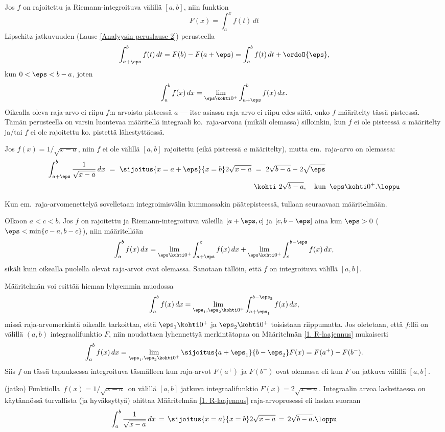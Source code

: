 Jos $f$ on rajoitettu ja Riemann-integroituva välillä $[a,b]$, niin funktion
\[
F(x)=\int_a^x f(t)\, dt
\]
Lipschitz-jatkuvuuden (Lause \ref{Analyysin peruslause 2}) perusteella
\[
\int_{a+\eps}^b f(t)\, dt = F(b)-F(a+\eps) = \int_a^b f(t)\, dt + \ordoO{\eps},
\]
kun $0<\eps<b-a$, joten
\[
\int_a^b f(x)\, dx = \lim_{\eps \kohti 0^+} \int_{a+\eps}^b f(x)\, dx.
\]
Oikealla oleva raja-arvo ei riipu $f$:n arvoista pisteessä $a$ --- itse asiassa raja-arvo ei
riipu edes siitä, onko $f$ määritelty tässä pisteessä. Tämän perusteella on varsin luontevaa
määritellä integraali ko.\ raja-arvona (mikäli olemassa) silloinkin, kun $f$ ei ole pisteessä 
$a$ määritelty ja/tai $f$ ei ole rajoitettu ko. pistettä lähestyttäessä.
\begin{Exa} \label{epäoleellinen esim1} Jos $f(x)=1/\sqrt{x-a}$, niin $f$ ei ole välillä 
$[a,b]$ rajoitettu (eikä pisteessä $a$ määritelty), mutta em.\ raja-arvo on olemassa: 
\begin{align*}
\int_{a+\eps}^b \frac{1}{\sqrt{x-a}}\,dx\ 
                      =\ \sijoitus{x=a+\eps}{x=b} 2\sqrt{x-a}\
                     &=\ 2\sqrt{b-a}-2\sqrt{\eps} \\ 
                     &\kohti\ 2\sqrt{b-a}, \quad \text{kun}\,\ \eps \kohti 0^+. \loppu
\end{align*}
\end{Exa}
Kun em.\ raja-arvomenettelyä sovelletaan integroimisvälin kummassakin päätepisteessä, tullaan
seuraavaan määritelmään.
\begin{Def} \vahv{(Riemannin integraalin 1. laajennus)} \label{1. R-laajennus}
 Olkoon $a<c<b$. Jos $f$ on rajoitettu ja
Riemann-integroituva väleillä $[a+\eps,c]$ ja $[c,b-\eps]$ aina kun $\eps>0$
($\eps<\min\{c-a,b-c\}$), niin määritellään
\[
\int_a^b f(x)\, dx = \lim_{\eps \kohti 0^+} \int_{a+\eps}^c f(x)\,dx
                   + \lim_{\eps \kohti 0^+} \int_c^{b-\eps} f(x)\,dx,
\]
sikäli kuin oikealla puolella olevat raja-arvot ovat olemassa. Sanotaan tällöin, että $f$ on
integroituva välillä $[a,b]$.
\end{Def}
Määritelmän voi esittää hieman lyhyemmin muodossa
\[
\int_a^b f(x)\,dx = \lim_{\eps_1,\eps_2 \kohti 0^+} \int_{a+\eps_1}^{b-\eps_2} f(x)\,dx,
\]
missä raja-arvomerkintä oikealla tarkoittaa, että $\eps_1 \kohti 0^+$ ja $\eps_2 \kohti 0^+$
toisistaan riippumatta. Jos oletetaan, että $f$:llä on välillä $(a,b)$ integraalifunktio $F$,
niin noudattaen lyhennettyä merkintätapaa on Määritelmän \ref{1. R-laajennus} mukaisesti
\[
\int_a^b f(x)\,dx = \lim_{\eps_1,\eps_2 \kohti 0^+}\sijoitus{a+\eps_1}{b-\eps_2} F(x)
                  = F(a^+)-F(b^-).
\]
Siis $f$ on tässä tapauksessa integroituva täsmälleen kun raja-arvot $F(a^+)$ ja $F(b^-)$ ovat
olemassa eli kun $F$ on jatkuva välillä $[a,b]$.
\jatko \begin{Exa} (jatko) Funktiolla $\,f(x)=1/\sqrt{x-a}\,$ on välillä $[a,b]$ jatkuva
integraalifunktio $F(x)=2\sqrt{x-a}$. Integraalin arvoa laskettaessa on käytännössä
turvallista (ja hyväksyttyä) ohittaa Määritelmän \ref{1. R-laajennus} raja-arvoprosessi eli
laskea suoraan
\[
\int_a^b \frac{1}{\sqrt{x-a}}\,dx \,=\, \sijoitus{x=a}{x=b} 2\sqrt{x-a} 
                                  \,=\, 2\sqrt{b-a}. \loppu
\]
\end{Exa}

